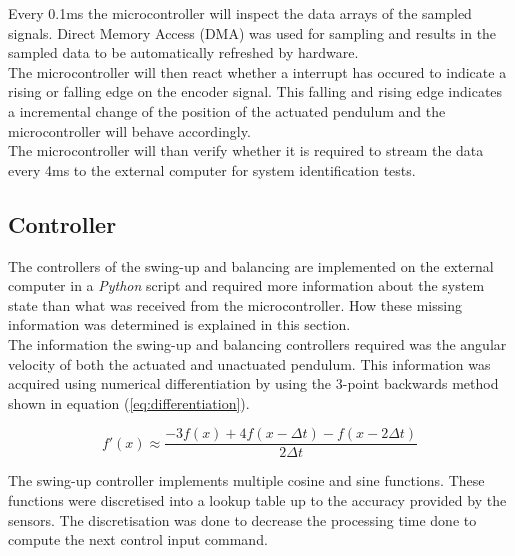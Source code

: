 Every 0.1ms the microcontroller will inspect the data arrays of the sampled signals. Direct Memory Access (DMA) was used for sampling and results in the sampled data to be automatically refreshed by hardware.\\

The microcontroller will then react whether a interrupt has occured to indicate a rising or falling edge on the encoder signal. This falling and rising edge indicates a incremental change of the position of the actuated pendulum and the microcontroller will behave accordingly.\\

The microcontroller will than verify whether it is required to stream the data every 4ms to the external computer for system identification tests.\\

\subsection{Controller}
The controllers of the swing-up and balancing are implemented on the external computer in a \textit{Python} script and required more information about the system state than what was received from the microcontroller. How these missing information was determined is explained in this section.\\

The information the swing-up and balancing controllers required was the angular velocity of both the actuated and unactuated pendulum. This information was acquired using numerical differentiation by using the 3-point backwards method shown in equation (\ref{eq:differentiation}).

\begin{equation} \label{eq:differentiation}
f'(x) \approx \frac{-3f(x)  +  4f(x-{\Delta}t)  -  f(x-2{\Delta}t)}{ 2{\Delta}t }
\end{equation}

The swing-up controller implements multiple cosine and sine functions. These functions were discretised into a lookup table up to the accuracy provided by the sensors. The discretisation was done to decrease the processing time done to compute the next control input command.


